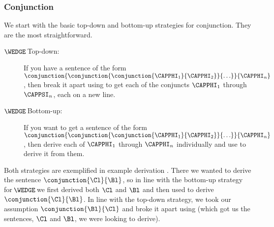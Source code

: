 \subsubsection*{Conjunction} 
We start with the basic top-down and bottom-up strategies for conjunction. They are the most straightforward.
\begin{description}
\item[$\WEDGE\!$ Top-down:] If you have a sentence of the form $\conjunction{\conjunction{\conjunction{\CAPPHI_1}{\CAPPHI_2}}{\ldots}}{\CAPPHI_n}$, then break it apart using  to get each of the conjuncts $\CAPPHI_1$ through $\CAPPSI_n$, each on a new line.
\item[$\WEDGE\!$ Bottom-up:] If you want to get a sentence of the form $\conjunction{\conjunction{\conjunction{\CAPPHI_1}{\CAPPHI_2}}{\ldots}}{\CAPPHI_n}$, then derive each of $\CAPPHI_1$ through $\CAPPHI_n$ individually and use  to derive it from them. 
\end{description} 
Both strategies are exemplified in example derivation . 
There we wanted to derive the sentence $\conjunction{\Cl}{\Bl}$, so in line with the bottom-up strategy for $\!\WEDGE\!$ we first derived both $\Cl$ and $\Bl$ and then used  to derive $\conjunction{\Cl}{\Bl}$. 
In line with the top-down strategy, we took our assumption $\conjunction{\Bl}{\Cl}$ and broke it apart using  (which got us the sentences, $\Cl$ and $\Bl$, we were looking to derive). 


